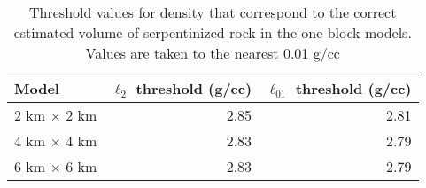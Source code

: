 \begin{table}
    \centering
        \caption{Threshold values for density that correspond to the correct estimated volume of serpentinized rock in the one-block models. Values are taken to the nearest 0.01 g/cc}
        \begin{tabular}[htb]{| l | r | r |}
            \hline
            \textbf{Model} & \textbf{$\ell_2$ threshold (g/cc)}& \textbf{$\ell_{01}$ threshold (g/cc)} \\
            \hline
            2 km $\times$ 2 km & 2.85 & 2.81 \\
            4 km $\times$ 4 km & 2.83 & 2.79 \\
            6 km $\times$ 6 km & 2.83 & 2.79 \\
            \hline
        \end{tabular}
        \label{tab:one-block-density}
     \end{table}


